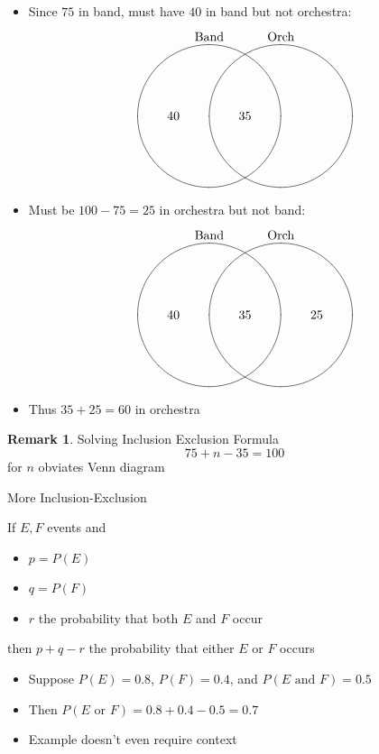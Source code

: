 \documentclass[handout]{beamer}
\theoremstyle{definition}
\newtheorem{remark}{Remark}
\begin{document}
\begin{frame}
\begin{itemize}
\item Since $75$ in band, must have
$40$ in band but not orchestra:
\[\begin{xy}<1cm,0cm>:
(-1,2)*+!D{\text{Band}};
(1,2)*+!D{\text{Orch}};
(-1,0)*\cir<2cm>{};
(1,0)*\cir<2cm>{};
(0,0)*{35};
(-2,0)*{40};
\end{xy}\]
\end{itemize}
\end{frame}

\begin{frame}
\begin{itemize}
\item Must be $100-75=25$ in orchestra but not band:
\[\begin{xy}<1cm,0cm>:
(-1,2)*+!D{\text{Band}};
(1,2)*+!D{\text{Orch}};
(-1,0)*\cir<2cm>{};
(1,0)*\cir<2cm>{};
(0,0)*{35};
(-2,0)*{40};
(2,0)*{25};
\end{xy}\]
\item Thus $35+25=60$ in orchestra
\end{itemize}
\begin{remark}
Solving Inclusion Exclusion Formula
\[75+n-35=100\]
for $n$ obviates Venn diagram
\end{remark}
\end{frame}

\begin{frame}{More Inclusion-Exclusion}
\begin{theorem}
If $E,F$ events and
\begin{itemize}
\item $p=P\left(E\right)$
\item $q=P\left(F\right)$
\item $r$ the probability that \alert{both} $E$ and $F$ occur
\end{itemize}
then $p+q-r$ the probability that \alert{either} $E$ or $F$ occurs
\end{theorem}
\begin{example}[Exercise 11]
\begin{itemize}
\item Suppose $P\left(E\right)=0.8$,
$P\left(F\right)=0.4$, and $P\left(\text{$E$ and $F$}\right)=0.5$
\item Then $P\left(\text{$E$ or $F$}\right)
=0.8+0.4-0.5=0.7$
\item Example doesn't even require context
\end{itemize}
\end{example}
\end{frame}
\end{document}
